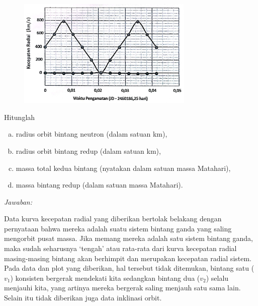 \documentclass[11pt,fleqn]{exam}
\begin{document}
\begin{questions}
\begin{figure}[!ht]
    \centering
    \includegraphics[width=0.75\textwidth]{soal_no6.jpg}
\end{figure}

Hitunglah
\begin{enumerate}[a.]
    \item radius orbit bintang neutron (dalam satuan km),
    \item radius orbit bintang redup (dalam satuan km),
    \item massa total kedua bintang (nyatakan dalam satuan massa Matahari),
    \item massa bintang redup (dalam satuan massa Matahari).
\end{enumerate}


\newpage
\textit{Jawaban:}

Data kurva kecepatan radial yang diberikan bertolak belakang dengan pernyataan bahwa mereka adalah suatu sistem bintang ganda yang saling mengorbit pusat massa. Jika memang mereka adalah satu sistem bintang ganda, maka sudah seharusnya `tengah' atau rata-rata dari kurva kecepatan radial masing-masing bintang akan berhimpit dan merupakan kecepatan radial sistem. Pada data dan plot yang diberikan, hal tersebut tidak ditemukan, bintang satu ($v_1$) konsisten bergerak mendekati kita sedangkan bintang dua ($v_2$) selalu menjauhi kita, yang artinya mereka bergerak saling menjauh satu sama lain. Selain itu tidak diberikan juga data inklinasi orbit.


\end{questions}
\end{document}
